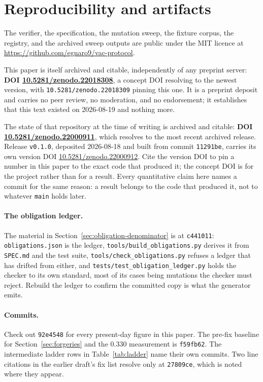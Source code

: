\documentclass[11pt]{article}
\begin{document}
\section*{Reproducibility and artifacts}

The verifier, the specification, the mutation sweep, the fixture corpus, the registry, and the
archived sweep outputs are public under the MIT licence at
\url{https://github.com/egnaro9/vac-protocol}.

This paper is itself archived and citable, independently of any preprint server:
\textbf{DOI \href{https://doi.org/10.5281/zenodo.22018308}{10.5281/zenodo.22018308}}, a concept
DOI resolving to the newest version, with \texttt{10.5281/zenodo.22018309} pinning this one. It
is a preprint deposit and carries no peer review, no moderation, and no endorsement; it
establishes that this text existed on 2026-08-19 and nothing more.

The state of that repository at the time of writing is archived and citable:
\textbf{DOI \href{https://doi.org/10.5281/zenodo.22000911}{10.5281/zenodo.22000911}}, which
resolves to the most recent archived release. Release \texttt{v0.1.0}, deposited 2026-08-18 and
built from commit \texttt{11291be}, carries its own version DOI
\href{https://doi.org/10.5281/zenodo.22000912}{10.5281/zenodo.22000912}. Cite the version DOI
to pin a number in this paper to the exact code that produced it; the concept DOI is for the
project rather than for a result. Every quantitative claim here names a commit for the same
reason: a result belongs to the code that produced it, not to whatever \texttt{main} holds
later.

\paragraph{The obligation ledger.} The material in
Section~\ref{sec:obligation-denominator} is at \texttt{c441011}:
\texttt{obligations.json} is the ledger, \texttt{tools/build\_obligations.py} derives it from
\texttt{SPEC.md} and the test suite, \texttt{tools/check\_obligations.py} refuses a ledger that
has drifted from either, and \texttt{tests/test\_obligation\_ledger.py} holds the checker to its
own standard, most of its cases being mutations the checker must reject. Rebuild the ledger to
confirm the committed copy is what the generator emits.

\paragraph{Commits.} Check out \texttt{92e4548} for every present-day figure in this paper.
The pre-fix baseline for Section~\ref{sec:forgeries} and the 0.330 measurement is
\texttt{f59fb62}. The intermediate ladder rows in Table~\ref{tab:ladder} name their own
commits. Two line citations in the earlier draft's fix list resolve only at \texttt{27809ce},
which is noted where they appear.
\end{document}
